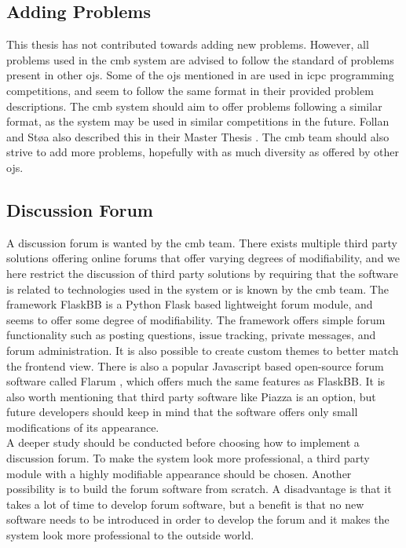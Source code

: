 \subsection{Adding Problems}
\label{sub-sec:prop-problems}
This thesis has not contributed towards adding new problems. However, all problems used in the \gls{cmb} system are advised to follow the standard of problems present in other \glspl{oj}. Some of the \glspl{oj} mentioned in  are used in \gls{icpc} programming competitions, and seem to follow the same format in their provided problem descriptions. The \gls{cmb} system should aim to offer problems following a similar format, as the system may be used in similar competitions in the future. Follan and Støa also described this in their Master Thesis \cite{mt:T&S}. The \gls{cmb} team should also strive to add more problems, hopefully with as much diversity as offered by other \glspl{oj}.

\subsection{Discussion Forum}
\label{sub-sec:prop-forum}
A discussion forum is wanted by the \gls{cmb} team. There exists multiple third party solutions offering online forums that offer varying degrees of modifiability, and we here restrict the discussion of third party solutions by requiring that the software is related to technologies used in the system or is known by the \gls{cmb} team. The framework FlaskBB \cite{FLASKBB} is a Python Flask based lightweight forum module, and seems to offer some degree of modifiability. The framework offers simple forum functionality such as posting questions, issue tracking, private messages, and forum administration. It is also possible to create custom themes to better match the frontend view. There is also a popular Javascript based open-source forum software called Flarum \cite{FLARUM}, which offers much the same features as FlaskBB. It is also worth mentioning that third party software like Piazza is an option, but future developers should keep in mind that the software offers only small modifications of its appearance. \\

A deeper study should be conducted before choosing how to implement a discussion forum. To make the system look more professional, a third party module with a highly modifiable appearance should be chosen. Another possibility is to build the forum software from scratch. A disadvantage is that it takes a lot of time to develop forum software, but a benefit is that no new software needs to be introduced in order to develop the forum and it makes the system look more professional to the outside world.

